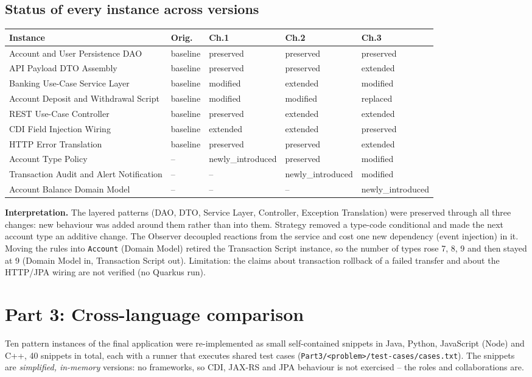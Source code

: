\documentclass[11pt,a4paper]{article}
\begin{document}
\subsection{Status of every instance across versions}
{\footnotesize
\begin{center}\begin{tabular}{@{}p{5.6cm}p{2.5cm}p{2.5cm}p{2.5cm}p{2.5cm}@{}}
\toprule \textbf{Instance} & \textbf{Orig.} & \textbf{Ch.1} & \textbf{Ch.2} & \textbf{Ch.3} \\ \midrule
Account and User Persistence DAO & baseline & preserved & preserved & preserved \\
API Payload DTO Assembly & baseline & preserved & preserved & extended \\
Banking Use-Case Service Layer & baseline & modified & extended & modified \\
Account Deposit and Withdrawal Script & baseline & modified & modified & replaced \\
REST Use-Case Controller & baseline & preserved & extended & extended \\
CDI Field Injection Wiring & baseline & extended & extended & preserved \\
HTTP Error Translation & baseline & preserved & preserved & extended \\
Account Type Policy & -- & newly\_introduced & preserved & modified \\
Transaction Audit and Alert Notification & -- & -- & newly\_introduced & modified \\
Account Balance Domain Model & -- & -- & -- & newly\_introduced \\
\bottomrule\end{tabular}\end{center}
}
\textbf{Interpretation.} The layered patterns (DAO, DTO, Service Layer, Controller, Exception Translation) were preserved through all three changes: new behaviour was added around them rather than into them. Strategy removed a type-code conditional and made the next account type an additive change. The Observer decoupled reactions from the service and cost one new dependency (event injection) in it. Moving the rules into \texttt{Account} (Domain Model) retired the Transaction Script instance, so the number of types rose 7, 8, 9 and then stayed at 9 (Domain Model in, Transaction Script out). Limitation: the claims about transaction rollback of a failed transfer and about the HTTP/JPA wiring are not verified (no Quarkus run).
\section{Part 3: Cross-language comparison}
Ten pattern instances of the final application were re-implemented as small self-contained snippets in Java, Python, JavaScript (Node) and C++, 40 snippets in total, each with a runner that executes shared test cases (\texttt{Part3/\allowbreak{}\textless{}problem\textgreater{}/\allowbreak{}test-cases/\allowbreak{}cases.\allowbreak{}txt}). The snippets are \emph{simplified, in-memory} versions: no frameworks, so CDI, JAX-RS and JPA behaviour is not exercised -- the roles and collaborations are.
\end{document}
